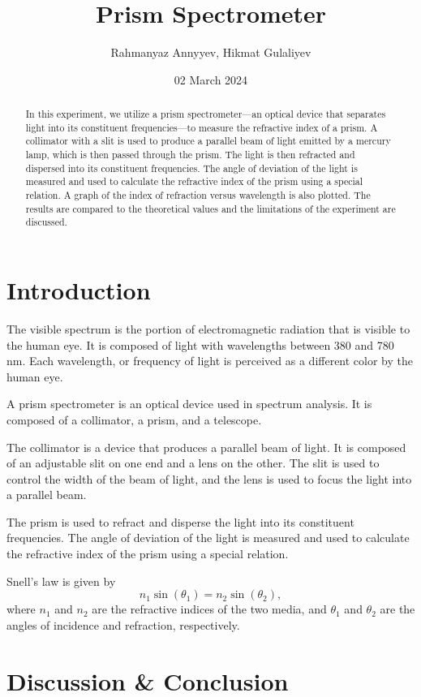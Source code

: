 \documentclass[10pt]{article}
\title{Prism Spectrometer}
\author{Rahmanyaz Annyyev, Hikmat Gulaliyev}
\date{02 March 2024}
\begin{document}
\maketitle

\begin{abstract}
In this experiment, we utilize a prism spectrometer---an optical device that separates light into its constituent frequencies---to measure the refractive index of a prism. A collimator with a slit is used to produce a parallel beam of light emitted by a mercury lamp, which is then passed through the prism. The light is then refracted and dispersed into its constituent frequencies. The angle of deviation of the light is measured and used to calculate the refractive index of the prism using a special relation. A graph of the index of refraction versus wavelength is also plotted. The results are compared to the theoretical values and the limitations of the experiment are discussed.
\end{abstract}

\section{Introduction}
The visible spectrum is the portion of electromagnetic radiation that is visible to the human eye. It is composed of light with wavelengths between 380 and 780 nm. Each wavelength, or frequency of light is perceived as a different color by the human eye\cite{Marcus_1998}. 



A prism spectrometer is an optical device used in spectrum analysis. It is composed of a collimator, a prism, and a telescope.

The collimator is a device that produces a parallel beam of light. It is composed of an adjustable slit on one end and a lens on the other. The slit is used to control the width of the beam of light, and the lens is used to focus the light into a parallel beam. 

The prism is used to refract and disperse the light into its constituent frequencies. The angle of deviation of the light is measured and used to calculate the refractive index of the prism using a special relation.



Snell's law is given by
\begin{equation}
    n_1 \sin(\theta_1) = n_2 \sin(\theta_2),
\end{equation}
where $n_1$ and $n_2$ are the refractive indices of the two media, and $\theta_1$ and $\theta_2$ are the angles of incidence and refraction, respectively.



\section{Discussion \& Conclusion}

\printbibliography
\end{document}
